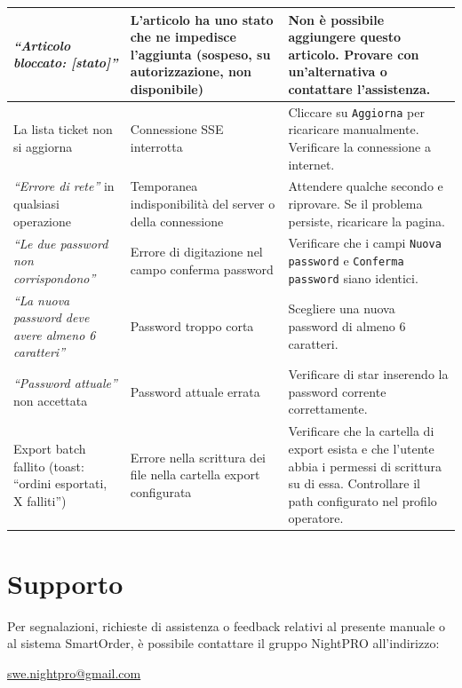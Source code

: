 \documentclass[a4paper, 11pt, oneside]{scrartcl}
\begin{document}
\begin{longtable}{|p{4cm}|p{4cm}|p{5.5cm}|}
    \hline
    \textit{``Articolo bloccato: [stato]''} & L'articolo ha uno stato che ne impedisce l'aggiunta (sospeso, su autorizzazione, non disponibile) & Non \`e possibile aggiungere questo articolo. Provare con un'alternativa o contattare l'assistenza. \\
    \hline
    La lista ticket non si aggiorna & Connessione SSE interrotta & Cliccare su \texttt{Aggiorna} per ricaricare manualmente. Verificare la connessione a internet. \\
    \hline
    \textit{``Errore di rete''} in qualsiasi operazione & Temporanea indisponibilit\`a del server o della connessione & Attendere qualche secondo e riprovare. Se il problema persiste, ricaricare la pagina. \\
    \hline
    \textit{``Le due password non corrispondono''} & Errore di digitazione nel campo conferma password & Verificare che i campi \texttt{Nuova password} e \texttt{Conferma password} siano identici. \\
    \hline
    \textit{``La nuova password deve avere almeno 6 caratteri''} & Password troppo corta & Scegliere una nuova password di almeno 6 caratteri. \\
    \hline
    \textit{``Password attuale''} non accettata & Password attuale errata & Verificare di star inserendo la password corrente correttamente. \\
    \hline
    Export batch fallito (toast: ``ordini esportati, X falliti'') & Errore nella scrittura dei file nella cartella export configurata & Verificare che la cartella di export esista e che l'utente abbia i permessi di scrittura su di essa. Controllare il path configurato nel profilo operatore. \\
    \hline
    \end{longtable}

\newpage
\section{Supporto}
Per segnalazioni, richieste di assistenza o feedback relativi al presente manuale o al sistema SmartOrder, \`e possibile contattare il gruppo NightPRO all'indirizzo:

\begin{center}
    \large \leavevmode\href{swe.nightpro@gmail.com}{swe.nightpro@gmail.com}
\end{center}
\end{document}
